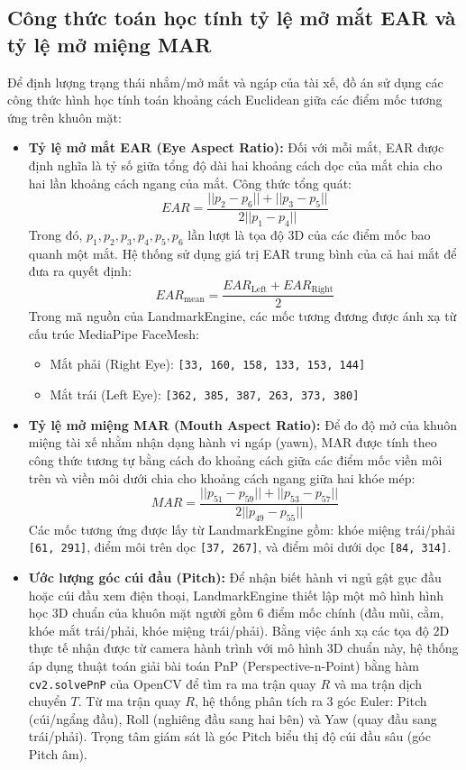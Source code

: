 \documentclass[../DoAn.tex]{subfiles}
\begin{document}
\subsection{Công thức toán học tính tỷ lệ mở mắt EAR và tỷ lệ mở miệng MAR}
Để định lượng trạng thái nhắm/mở mắt và ngáp của tài xế, đồ án sử dụng các công thức hình học tính toán khoảng cách Euclidean giữa các điểm mốc tương ứng trên khuôn mặt:
\begin{itemize}
    \item \textbf{Tỷ lệ mở mắt EAR (Eye Aspect Ratio):} Đối với mỗi mắt, EAR được định nghĩa là tỷ số giữa tổng độ dài hai khoảng cách dọc của mắt chia cho hai lần khoảng cách ngang của mắt. Công thức tổng quát:
    \[ EAR = \frac{||p_2 - p_6|| + ||p_3 - p_5||}{2 ||p_1 - p_4||} \]
    Trong đó, $p_1, p_2, p_3, p_4, p_5, p_6$ lần lượt là tọa độ 3D của các điểm mốc bao quanh một mắt. Hệ thống sử dụng giá trị EAR trung bình của cả hai mắt để đưa ra quyết định:
    \[ EAR_{\text{mean}} = \frac{EAR_{\text{Left}} + EAR_{\text{Right}}}{2} \]
    Trong mã nguồn của LandmarkEngine, các mốc tương đương được ánh xạ từ cấu trúc MediaPipe FaceMesh:
    \begin{itemize}
        \item Mắt phải (Right Eye): \texttt{[33, 160, 158, 133, 153, 144]}
        \item Mắt trái (Left Eye): \texttt{[362, 385, 387, 263, 373, 380]}
    \end{itemize}

    \item \textbf{Tỷ lệ mở miệng MAR (Mouth Aspect Ratio):} Để đo độ mở của khuôn miệng tài xế nhằm nhận dạng hành vi ngáp (yawn), MAR được tính theo công thức tương tự bằng cách đo khoảng cách giữa các điểm mốc viền môi trên và viền môi dưới chia cho khoảng cách ngang giữa hai khóe mép:
    \[ MAR = \frac{||p_{51} - p_{59}|| + ||p_{53} - p_{57}||}{2 ||p_{49} - p_{55}||} \]
    Các mốc tương ứng được lấy từ LandmarkEngine gồm: khóe miệng trái/phải \texttt{[61, 291]}, điểm môi trên dọc \texttt{[37, 267]}, và điểm môi dưới dọc \texttt{[84, 314]}.

    \item \textbf{Ước lượng góc cúi đầu (Pitch):} Để nhận biết hành vi ngủ gật gục đầu hoặc cúi đầu xem điện thoại, LandmarkEngine thiết lập một mô hình hình học 3D chuẩn của khuôn mặt người gồm 6 điểm mốc chính (đầu mũi, cằm, khóe mắt trái/phải, khóe miệng trái/phải). Bằng việc ánh xạ các tọa độ 2D thực tế nhận được từ camera hành trình với mô hình 3D chuẩn này, hệ thống áp dụng thuật toán giải bài toán PnP (Perspective-n-Point) bằng hàm \texttt{cv2.solvePnP} của OpenCV để tìm ra ma trận quay $R$ và ma trận dịch chuyển $T$. Từ ma trận quay $R$, hệ thống phân tích ra 3 góc Euler: Pitch (cúi/ngẩng đầu), Roll (nghiêng đầu sang hai bên) và Yaw (quay đầu sang trái/phải). Trọng tâm giám sát là góc Pitch biểu thị độ cúi đầu sâu (góc Pitch âm).
\end{itemize}
\end{document}
